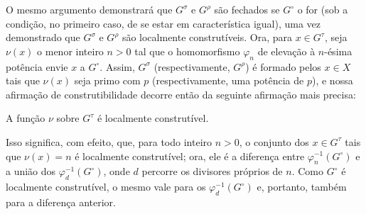 O mesmo argumento demonstrará que $G^\sigma$ e $G^\rho$ são fechados se
$G^\circ$ o for (sob a condição, no primeiro caso, de se estar em
característica igual), uma vez demonstrado que $G^\sigma$ e $G^\rho$ são
localmente construtíveis. Ora, para $x\in G^\tau$, seja $\nu(x)$ o menor
inteiro $n>0$ tal que o homomorfismo $\varphi_n$ de elevação à $n$-ésima
potência envie $x$ a $G^\circ$. Assim, $G^\sigma$ (respectivamente,
$G^\rho$) é formado pelos $x\in X$ tais que $\nu(x)$ seja primo com $p$
(respectivamente, uma potência de $p$), e nossa afirmação de construtibilidade
decorre então da seguinte afirmação mais precisa:

 A função $\nu$ sobre $G^\tau$ é localmente construtível.

Isso significa, com efeito, que, para todo inteiro $n>0$, o conjunto dos
$x\in G^\tau$ tais que $\nu(x)=n$ é localmente construtível; ora, ele é a
diferença entre $\varphi_n^{-1}(G^\circ)$ e a união dos
$\varphi_d^{-1}(G^\circ)$, onde $d$ percorre os divisores próprios de $n$.
Como $G^\circ$ é localmente construtível, o mesmo vale para os
$\varphi_d^{-1}(G^\circ)$ e, portanto, também para a diferença anterior.

